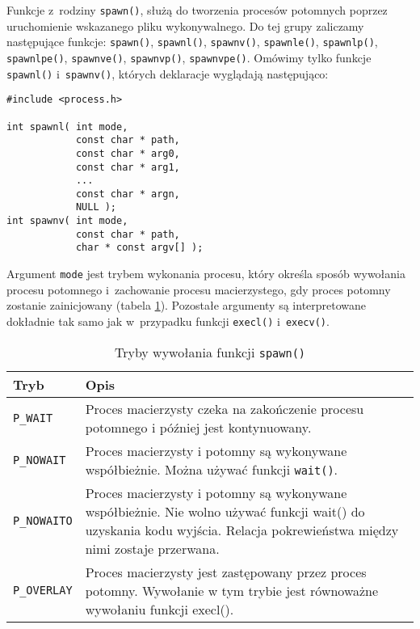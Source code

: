 Funkcje z~rodziny \texttt{spawn()}, służą do tworzenia procesów potomnych
poprzez uruchomienie wskazanego pliku wykonywalnego. Do tej grupy zaliczamy
następujące funkcje: \texttt{spawn()}, \texttt{spawnl()}, \texttt{spawnv()},
\texttt{spawnle()}, \texttt{spawnlp()}, \texttt{spawnlpe()},
\texttt{spawnve()}, \texttt{spawnvp()}, \texttt{spawnvpe()}. Omówimy tylko
funkcje \texttt{spawnl()} i~\texttt{spawnv()}, których deklaracje wyglądają
następująco:
\begin{lstlisting}[style=MyCStyle]
#include <process.h>

int spawnl( int mode,
            const char * path,
            const char * arg0,
            const char * arg1,
            ...
            const char * argn,
            NULL );
int spawnv( int mode,
            const char * path,
            char * const argv[] );
\end{lstlisting}
Argument \texttt{mode} jest trybem wykonania procesu, który określa sposób
wywołania procesu potomnego i~zachowanie procesu macierzystego, gdy proces
potomny zostanie zainicjowany (tabela \ref{tab:V0CUU}). Pozostałe argumenty są
interpretowane dokładnie tak samo jak w~przypadku funkcji \texttt{execl()}
i~\texttt{execv()}.

\begin{table}
  \caption{Tryby wywołania funkcji \texttt{spawn()}}
  \label{tab:V0CUU}
  \begin{tabular}{|l|p{}|}
    \hline
    \textbf{Tryb}       & \textbf{Opis}
    \\ \hline
    \texttt{P\_WAIT}    & Proces macierzysty czeka na zakończenie procesu
                          potomnego i później jest kontynuowany.
    \\ \hline
    \texttt{P\_NOWAIT}  & Proces macierzysty i potomny są wykonywane
                          współbieżnie. Można używać funkcji \texttt{wait()}.
    \\ \hline
    \texttt{P\_NOWAITO} & Proces macierzysty i potomny są wykonywane
                          współbieżnie. Nie wolno używać funkcji wait() do
                          uzyskania kodu wyjścia. Relacja pokrewieństwa między
                          nimi zostaje przerwana.
    \\ \hline
    \texttt{P\_OVERLAY} & Proces macierzysty jest zastępowany przez proces
                          potomny. Wywołanie w tym trybie jest równoważne
                          wywołaniu funkcji execl().
    \\ \hline
  \end{tabular}
\end{table}

